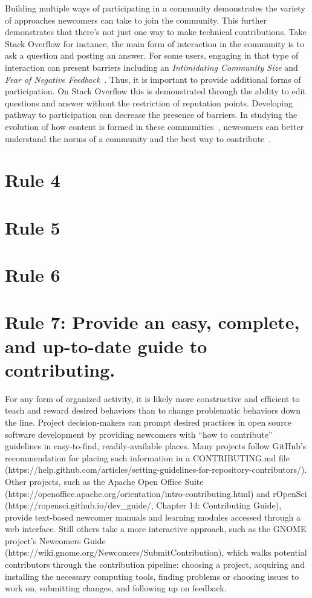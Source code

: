 \documentclass[10pt,letterpaper]{article}
\newcommand{\rulemajor}[1]{\section{#1}}
\begin{document}
Building multiple ways of participating in a community demonstrates the variety of approaches newcomers can take to join the community. This further demonstrates that there’s not just one way to make technical contributions.  Take Stack Overflow for instance, the main form of interaction in the community is to ask a question and posting an answer. For some users, engaging in that type of interaction can present barriers including an \emph{Intimidating Community Size} and \emph{Fear of Negative Feedback}~\cite{ford2016paradise}. Thus, it is important to provide additional forms of participation. On Stack Overflow this is demonstrated through the ability to edit questions and answer without the restriction of reputation points.  Developing pathway to participation can decrease the presence of barriers. In studying the evolution of how content is formed in these communities~\cite{baltes2018evolution}, newcomers can better understand the norms of a community and the best way to contribute~\cite{ford2018wedont}.

\rulemajor{Rule 4}

\rulemajor{Rule 5}

\rulemajor{Rule 6}

\rulemajor{Rule 7: Provide an easy, complete, and up-to-date guide to contributing.}

For any form of organized activity,
it is likely more constructive and efficient to teach and reward desired behaviors
than to change problematic behaviors down the line.
Project decision-makers can prompt desired practices in open source software development
by providing newcomers with ``how to contribute'' guidelines in easy-to-find, readily-available places.
Many projects follow GitHub's recommendation for placing such information
in a CONTRIBUTING.md file (https://help.github.com/articles/setting-guidelines-for-repository-contributors/).
Other projects,
such as the Apache Open Office Suite (https://openoffice.apache.org/orientation/intro-contributing.html)
and rOpenSci (https://ropensci.github.io/dev\_guide/, Chapter 14: Contributing Guide),
provide text-based newcomer manuals and learning modules accessed through a web interface.
Still others take a more interactive approach,
such as the GNOME project's Newcomers Guide (https://wiki.gnome.org/Newcomers/SubmitContribution),
which walks potential contributors through the contribution pipeline:
choosing a project,
acquiring and installing the necessary computing tools,
finding problems or choosing issues to work on,
submitting changes,
and following up on feedback.
\end{document}
